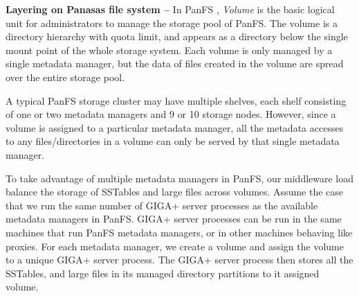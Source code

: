 \textbf{Layering on Panasas file system -- }
In PanFS \cite{PanFS}, \textit{Volume} is the basic logical unit
for administrators to manage the storage pool of PanFS.
The volume is a directory hierarchy with quota limit, and appears
as a directory below the single mount point of the whole storage system.
Each volume is only managed by a single metadata manager, but
the data of files created in the volume are spread over the entire storage pool.

A typical PanFS storage cluster may have multiple shelves,
each shelf consisting of one or two metadata managers and 9 or 10 storage nodes.
However, since a volume is assigned to a particular metadata manager,
all the metadata accesses to any files/directories in a volume
can only be served by that single metadata manager.

To take advantage of multiple metadata managers in PanFS,
our middleware load balance the storage of SSTables and large files across volumes.
Assume the case that we run the same number of GIGA+ server processes
as the available metadata managers in PanFS.
GIGA+ server processes can be run in the same machines that run PanFS metadata managers,
or in other machines behaving like proxies.
For each metadata manager, we create a volume and assign the volume
to a unique GIGA+ server process.
The GIGA+ server process then stores all the SSTables,
and large files in its managed directory partitions to it assigned volume.
